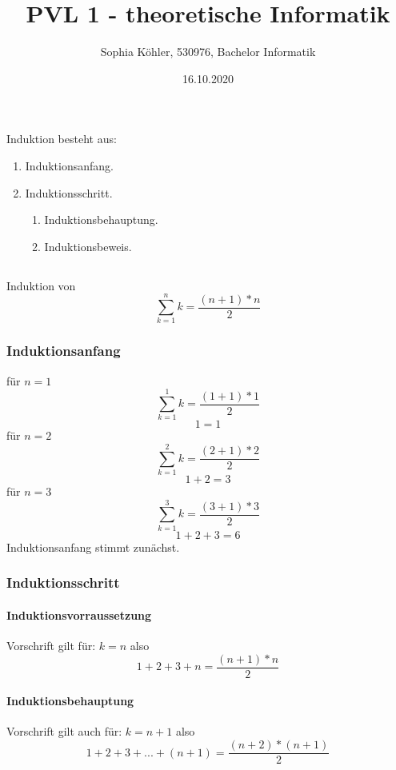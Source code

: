 \documentclass{article}
\title{PVL 1 - theoretische Informatik}
\author{Sophia Köhler, 530976, Bachelor Informatik}
\date{16.10.2020}
\begin{document}
\maketitle

\section{}
Induktion besteht aus:
\begin{enumerate}
  \item Induktionsanfang.
  \item Induktionsschritt.
  	\begin{enumerate}
	  \item Induktionsbehauptung.
  	\item Induktionsbeweis.
  	\end{enumerate}
\end{enumerate}
\subsection{}
Induktion von \[ \sum_{k=1}^{n}{k} = \frac{(n+1)*n}{2} \]
\subsubsection{Induktionsanfang}

für $n=1$
\[ \sum_{k=1}^{1}{k} = \frac{(1+1)*1}{2} \]
\[ 1 = 1 \]
\newline
für $n=2$
\[ \sum_{k=1}^{2}{k} = \frac{(2+1)*2}{2} \]
\[ 1+2 = 3 \]
\newline
\clearpage
für $n=3$
\[ \sum_{k=1}^{3}{k} = \frac{(3+1)*3}{2} \]
\[ 1+2+3 = 6 \]
\newline
Induktionsanfang stimmt zunächst.
\subsubsection{Induktionsschritt}
\paragraph{Induktionsvorraussetzung}\mbox{}

Vorschrift gilt für: $k=n$ also \[1+2+3+n = \frac{(n+1)*n}{2} \]

\paragraph{Induktionsbehauptung}\mbox{}

Vorschrift gilt auch für: $k=n+1$ also \[1+2+3+...+(n+1) = \frac{(n+2)*(n+1)}{2} \]
\end{document}
